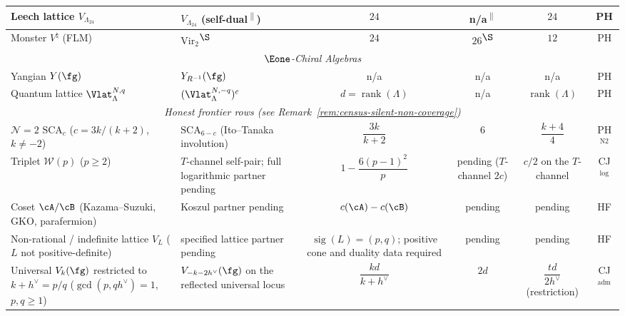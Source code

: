 \begin{table}[ht]
{{\begin{tabular}{|l|l|c|c|c|c|}
\hline
Leech lattice $V_{\Lambda_{24}}$
 & $V_{\Lambda_{24}}$ (self-dual\textsuperscript{$\|$})
 & $24$ & n/a\textsuperscript{$\|$}
 & $24$ & PH \\
\hline
Monster $V^\natural$ (FLM)
 & $\mathrm{Vir}_2$\textsuperscript{$\S$}
 & $24$ & $26$\textsuperscript{$\S$}
 & $12$ & PH \\
\hline
\multicolumn{6}{|c|}{\textit{$\Eone$-Chiral Algebras}} \\
\hline
Yangian $Y(\fg)$
 & $Y_{R^{-1}}(\fg)$
 & n/a & n/a & n/a & PH \\
\hline
Quantum lattice $\Vlat_\Lambda^{N,q}$
 & $(\Vlat_\Lambda^{N,-q})^c$
 & $d = \operatorname{rank}(\Lambda)$ & n/a
 & $\operatorname{rank}(\Lambda)$ & PH \\
\hline
\multicolumn{6}{|c|}{\textit{Honest frontier rows
 \textup{(}see Remark~\textup{\ref{rem:census-silent-non-coverage}}\textup{)}}} \\
\hline
$\mathcal{N}{=}2$ $\mathrm{SCA}_c$
 \textup{(}$c = 3k/(k{+}2)$, $k \ne -2$\textup{)}
 & $\mathrm{SCA}_{6-c}$ \textup{(}Ito--Tanaka involution\textup{)}
 & $\dfrac{3k}{k+2}$ & $6$
 & $\dfrac{k+4}{4}$ & PH$^{\mathrm{N2}}$ \\[4pt]
\hline
Triplet $\mathcal{W}(p)$ \textup{(}$p \ge 2$\textup{)}
 & $T$-channel self-pair; full logarithmic partner pending
 & $1 - \dfrac{6(p{-}1)^2}{p}$ & pending \textup{(}$T$-channel $2c$\textup{)}
 & $c/2$ on the $T$-channel & CJ$^{\mathrm{log}}$ \\[4pt]
\hline
Coset $\cA/\cB$
 \textup{(}Kazama--Suzuki, GKO, parafermion\textup{)}
 & Koszul partner pending
 & $c(\cA) - c(\cB)$ & pending
 & pending & HF \\[4pt]
\hline
Non-rational / indefinite lattice $V_L$
 \textup{(}$L$ not positive-definite\textup{)}
 & specified lattice partner pending
 & $\operatorname{sig}(L)=(p,q)$; positive cone and duality data required
 & pending
 & pending & HF \\[4pt]
\hline
Universal $V_k(\fg)$ restricted to $k + h^\vee = p/q$
 \textup{(}$\gcd(p,qh^\vee) = 1$, $p,q \ge 1$\textup{)}
 & $V_{-k-2h^\vee}(\fg)$ on the reflected universal locus
 & $\dfrac{kd}{k + h^\vee}$ & $2d$
 & $\dfrac{td}{2h^\vee}$ \textup{(}restriction\textup{)}
 & CJ$^{\mathrm{adm}}$ \\[4pt]
\hline
\end{tabular}%
}%
}%
\end{table}

